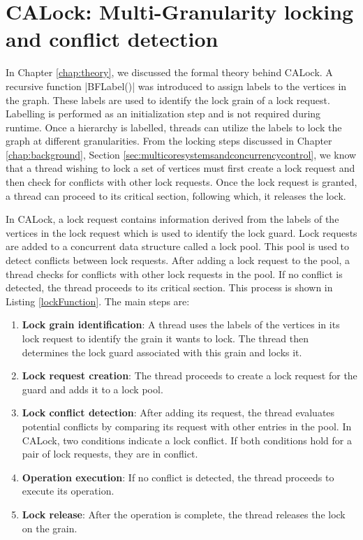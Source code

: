 
\chapter{CALock: Multi-Granularity locking and conflict detection} \label{chap:calock}

\minitoc

In Chapter \ref{chap:theory}, we discussed the formal theory behind CALock. A recursive function \inline|BFLabel()| was introduced to assign labels to the vertices in the graph. These labels are used to identify the lock grain of a lock request. Labelling is performed as an initialization step and is not required during runtime. Once a hierarchy is labelled, threads can utilize the labels to lock the graph at different granularities. From the locking steps discussed in Chapter \ref{chap:background}, Section \ref{sec:multicoresystemsandconcurrencycontrol}, we know that a thread wishing to lock a set of vertices must first create a lock request and then check for conflicts with other lock requests. Once the lock request is granted, a thread can proceed to its critical section, following which, it releases the lock.

In CALock, a lock request contains information derived from the labels of the vertices in the lock request which is used to identify the lock guard. Lock requests are added to a concurrent data structure called a lock pool. This pool is used to detect conflicts between lock requests. After adding a lock request to the pool, a thread checks for conflicts with other lock requests in the pool. If no conflict is detected, the thread proceeds to its critical section. This process is shown in Listing \ref{lockFunction}. The main steps are: 

\begin{enumerate}
	\item \textbf{Lock grain identification}: A thread uses the labels of the vertices in its lock request to identify the grain it wants to lock. The thread then determines the lock guard associated with this grain and locks it.
	\item \textbf{Lock request creation}: The thread proceeds to create a lock request for the guard and adds it to a lock pool. 
	\item \textbf{Lock conflict detection}: After adding its request, the thread evaluates potential conflicts by comparing its request with other entries in the pool. In CALock, two conditions indicate a lock conflict. If both conditions hold for a pair of lock requests, they are in conflict.
	\item \textbf{Operation execution}: If no conflict is detected, the thread proceeds to execute its operation.
	\item \textbf{Lock release}: After the operation is complete, the thread releases the lock on the grain.
\end{enumerate}

